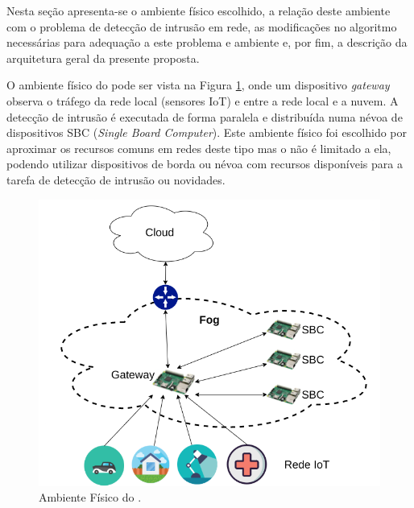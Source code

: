 Nesta seção apresenta-se o ambiente físico escolhido, a relação deste ambiente
com o problema de detecção de intrusão em rede, as modificações no algoritmo
necessárias para adequação a este problema e ambiente e, por fim, a descrição
da arquitetura geral da presente proposta.

O ambiente físico do \mfog pode ser vista na Figura
\ref{fig:arq-fisica-mfog}, onde um dispositivo \emph{gateway} observa o tráfego
da rede local (sensores IoT) e entre a rede local e a nuvem.
A detecção de intrusão é executada de forma paralela e distribuída numa névoa de
dispositivos SBC (\emph{Single Board Computer}).
Este ambiente físico foi escolhido por aproximar os recursos comuns em redes
deste tipo mas o \mfog não é limitado a ela, podendo utilizar dispositivos de
borda ou névoa com recursos disponíveis para a tarefa de detecção de intrusão ou
novidades.



\begin{figure}[htb]
  \centerline{
    \includegraphics[width=0.6\linewidth,page=1]{figures/arq-mfog.png}
  }
  \caption{Ambiente Físico do \mfog.}
  \label{fig:arq-fisica-mfog}
\end{figure}


